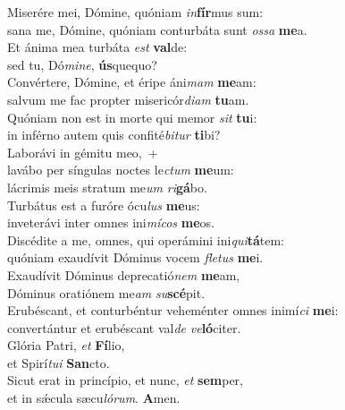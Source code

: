 \evenverse Miserére mei, Dómine, quóniam \textit{in}\textbf{fír}mus sum:~\*\\
\evenverse sana me, Dómine, quóniam conturbáta sunt \textit{os}\textit{sa} \textbf{me}a.\\
\oddverse Et ánima mea turbáta \textit{est} \textbf{val}de:~\*\\
\oddverse sed tu, Dó\textit{mi}\textit{ne}, \textbf{ús}quequo?\\
\evenverse Convértere, Dómine, et éripe áni\textit{mam} \textbf{me}am:~\*\\
\evenverse salvum me fac propter misericór\textit{di}\textit{am} \textbf{tu}am.\\
\oddverse Quóniam non est in morte qui memor \textit{sit} \textbf{tu}i:~\*\\
\oddverse in inférno autem quis confité\textit{bi}\textit{tur} \textbf{ti}bi?\\
\evenverse Laborávi in gémitu meo,~+\\
\evenverse  lavábo per síngulas noctes le\textit{ctum} \textbf{me}um:~\*\\
\evenverse lácrimis meis stratum me\textit{um} \textit{ri}\textbf{gá}bo.\\
\oddverse Turbátus est a furóre ócu\textit{lus} \textbf{me}us:~\*\\
\oddverse inveterávi inter omnes ini\textit{mí}\textit{cos} \textbf{me}os.\\
\evenverse Discédite a me, omnes, qui operámini ini\textit{qui}\textbf{tá}tem:~\*\\
\evenverse quóniam exaudívit Dóminus vocem \textit{fle}\textit{tus} \textbf{me}i.\\
\oddverse Exaudívit Dóminus deprecatió\textit{nem} \textbf{me}am,~\*\\
\oddverse Dóminus oratiónem me\textit{am} \textit{su}\textbf{scé}pit.\\
\evenverse Erubéscant, et conturbéntur veheménter omnes inimí\textit{ci} \textbf{me}i:~\*\\
\evenverse convertántur et erubéscant val\textit{de} \textit{ve}\textbf{ló}citer.\\
\oddverse Glória Patri, \textit{et} \textbf{Fí}lio,~\*\\
\oddverse et Spirí\textit{tu}\textit{i} \textbf{San}cto.\\
\evenverse Sicut erat in princípio, et nunc, \textit{et} \textbf{sem}per,~\*\\
\evenverse et in sǽcula sæcu\textit{ló}\textit{rum}. \textbf{A}men.\\
